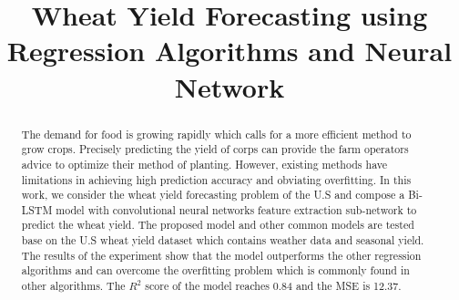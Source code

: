 \documentclass[conference, a4paper]{IEEEtran}
\begin{document}
\title{Wheat Yield Forecasting using Regression Algorithms and Neural Network}
\author{
\and
{}
\and
{}
\and
{}
}

\maketitle

\begin{abstract}
  The demand for food is growing rapidly which calls for a more efficient method to grow crops. 
  Precisely predicting the yield of corps can provide the farm operators advice to optimize their method of planting.
  However, existing methods have limitations in achieving high prediction accuracy and obviating overfitting.
  In this work, we consider the wheat yield forecasting problem of the U.S and compose a Bi-LSTM model with convolutional neural networks feature extraction sub-network to predict the wheat yield. 
  The proposed model and other common models are tested base on the U.S wheat yield dataset which contains weather data and seasonal yield.
  The results of the experiment show that the model outperforms the other regression algorithms and can overcome the overfitting problem which is commonly found in other algorithms. The $R^2$ score of the model reaches 0.84 and the MSE is 12.37. 
\end{abstract}
\end{document}
